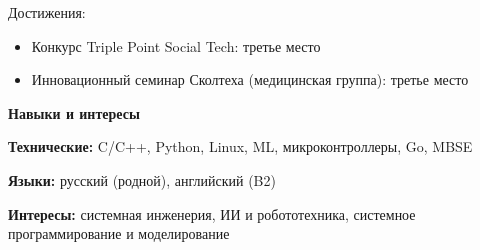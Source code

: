 \documentclass[11pt]{article}
\begin{document}
Достижения:
\begin{itemize}[noitemsep, topsep=0pt, partopsep=0pt, parsep=0pt]
  \item Конкурс Triple Point Social Tech: третье место
  \item Инновационный семинар Сколтеха (медицинская группа): третье место
\end{itemize}

\begin{center}
  \textbf{Навыки и интересы}
\end{center}

\textbf{Технические:} C/C++, Python, Linux, ML, микроконтроллеры, Go, MBSE

\textbf{Языки:} русский (родной), английский (B2)

\textbf{Интересы:} системная инженерия, ИИ и робототехника, системное программирование и моделирование
\end{document}

